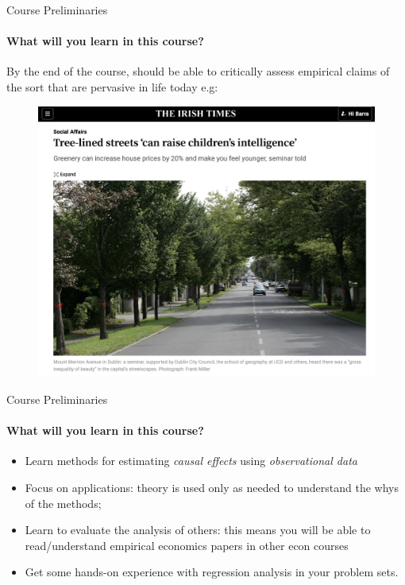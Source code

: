 \documentclass[11pt,english,handout]{beamer}
\begin{document}
\begin{frame}{Course Preliminaries}
	\framesubtitle{What will you learn in this course?}
	\vspace{0.5cm}
	By the end of the course, should be able to critically assess empirical claims of the sort that are pervasive in life today e.g:
	\begin{figure}
		\centering
		\includegraphics[width=\textwidth, trim=0 250 0 0, clip]{tree-lined-streets.png} %
	\end{figure}
	
	\end{frame}
	
\begin{frame}{Course Preliminaries}
	\framesubtitle{What will you learn in this course?}
	\begin{itemize}
		\item Learn methods for estimating \textit{causal effects} using \textit{observational data}
		\item Focus on applications: theory is used only as needed to understand the whys of the methods;
		\item Learn to evaluate the analysis of others: this means you will be able to read/understand empirical economics papers in other econ courses
		\item Get some hands-on experience with regression analysis in your problem sets.
		
	\end{itemize}


\end{frame}
\end{document}
